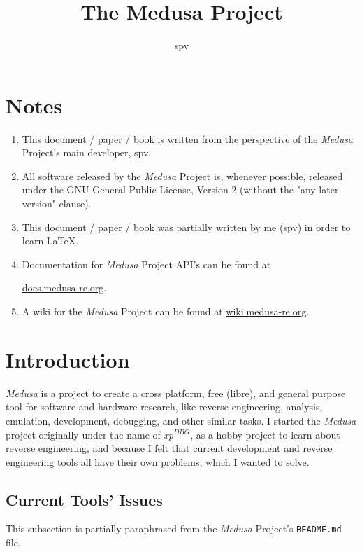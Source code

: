 \documentclass{article}
\title{The Medusa Project}
\author{spv}
\newcommand{\xpDBG}{\textit{xp$^{DBG}$}\xspace}
\begin{document}
	\maketitle

	\section{Notes}
	\begin{enumerate}
		\item This document / paper / book is written from the perspective of
		the \textit{Medusa} Project's main developer, spv.

		\item All software released by the \textit{Medusa} Project is, whenever
		possible, released under the GNU General Public License, Version 2
		(without the "any later version" clause).

		\item This document / paper / book was partially written by me (spv) in
		order to learn \LaTeX.

		\item Documentation for \textit{Medusa} Project API's can be found at
		
		\href{https://docs.medusa-re.org}{docs.medusa-re.org}.

		\item A wiki for the \textit{Medusa} Project can be found at
		\href{https://wiki.medusa-re.org}{wiki.medusa-re.org}.
	\end{enumerate}

	\section{Introduction}
	\textit{Medusa} is a project to create a cross platform, free (libre), and
	general purpose tool for software and hardware research, like reverse
	engineering, analysis, emulation, development, debugging, and other similar
	tasks. I started the \textit{Medusa} project originally under the name of
	\xpDBG, as a hobby project to learn about reverse engineering, and because I
	felt that current development and reverse engineering tools all have their
	own problems, which I wanted to solve.

	\subsection{Current Tools' Issues}
	This subsection is partially paraphrased from the \textit{Medusa} Project's
	\texttt{README.md} file.
\end{document}
